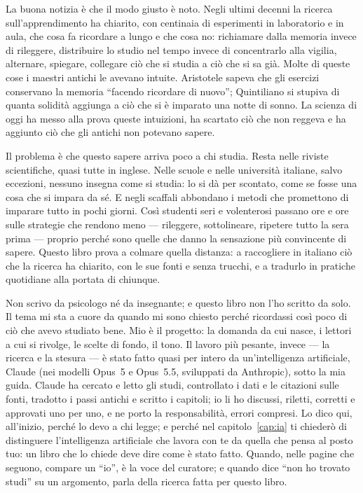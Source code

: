 La buona notizia è che il modo giusto è noto. Negli ultimi decenni la
ricerca sull'apprendimento ha chiarito, con centinaia di esperimenti in
laboratorio e in aula, che cosa fa ricordare a lungo e che cosa no:
richiamare dalla memoria invece di rileggere, distribuire lo studio nel
tempo invece di concentrarlo alla vigilia, alternare, spiegare,
collegare ciò che si studia a ciò che si sa già. Molte di queste cose i
maestri antichi le avevano intuite. Aristotele sapeva che gli esercizi
conservano la memoria \enquote{facendo ricordare di nuovo}; Quintiliano
si stupiva di quanta solidità aggiunga a ciò che si è imparato una
notte di sonno. La scienza di oggi ha messo alla prova queste
intuizioni, ha scartato ciò che non reggeva e ha aggiunto ciò che gli
antichi non potevano sapere.

Il problema è che questo sapere arriva poco a chi studia. Resta nelle
riviste scientifiche, quasi tutte in inglese. Nelle scuole e nelle
università italiane, salvo eccezioni, nessuno insegna come si studia:
lo si dà per scontato, come se fosse una cosa che si impara da sé. E
negli scaffali abbondano i metodi che promettono di imparare tutto in
pochi giorni. Così studenti seri e volenterosi passano ore e ore sulle
strategie che rendono meno --- rileggere, sottolineare, ripetere tutto
la sera prima --- proprio perché sono quelle che danno la sensazione
più convincente di sapere. Questo libro prova a colmare quella
distanza: a raccogliere in italiano ciò che la ricerca ha chiarito, con
le sue fonti e senza trucchi, e a tradurlo in pratiche quotidiane alla
portata di chiunque.

Non scrivo da psicologo né da insegnante; e questo libro non l'ho
scritto da solo. Il tema mi sta a cuore da quando mi sono chiesto
perché ricordassi così poco di ciò che avevo studiato bene. Mio è il
progetto: la domanda da cui nasce, i lettori a cui si rivolge, le
scelte di fondo, il tono. Il lavoro più pesante, invece --- la ricerca e
la stesura --- è stato fatto quasi per intero da un'intelligenza
artificiale, Claude (nei modelli Opus~5 e Opus~5.5, sviluppati da
Anthropic), sotto la mia guida. Claude ha cercato e letto gli studi,
controllato i dati e le citazioni sulle fonti, tradotto i passi antichi
e scritto i capitoli; io li ho discussi, riletti, corretti e approvati
uno per uno, e ne porto la responsabilità, errori compresi. Lo dico
qui, all'inizio, perché lo devo a chi legge; e perché nel
capitolo~\ref{cap:ia}
ti chiederò di distinguere l'intelligenza
artificiale che lavora con te da quella che pensa al posto tuo: un libro
che lo chiede deve dire come è stato fatto. Quando, nelle pagine che
seguono, compare un \enquote{io}, è la voce del curatore; e quando
dice \enquote{non ho trovato studi} su un argomento, parla della
ricerca fatta per questo libro.

